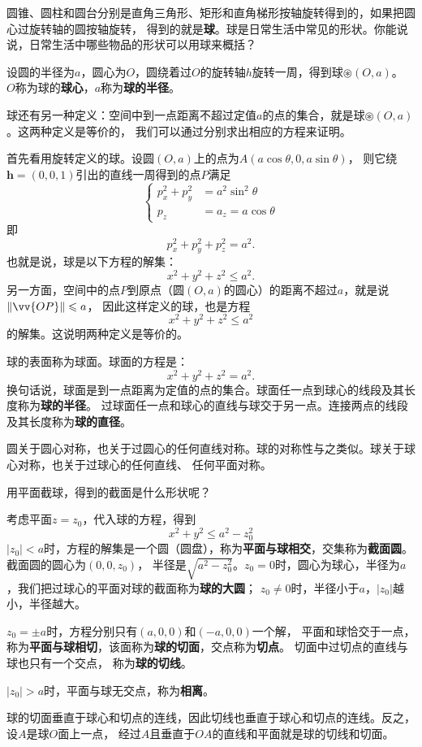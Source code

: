\documentclass[12pt,UTF8]{ctexbook}
\begin{document}
圆锥、圆柱和圆台分别是直角三角形、矩形和直角梯形按轴旋转得到的，如果把圆心过旋转轴的圆按轴旋转，
得到的就是\textbf{球}。球是日常生活中常见的形状。你能说说，日常生活中哪些物品的形状可以用球来概括？

设圆的半径为$a$，圆心为$O$，圆绕着过$O$的旋转轴$h$旋转一周，得到球$\circledast(O,a)$。
$O$称为球的\textbf{球心}，$a$称为\textbf{球的半径}。

球还有另一种定义：空间中到一点距离不超过定值$a$的点的集合，就是球$\circledast(O,a)$。这两种定义是等价的，
我们可以通过分别求出相应的方程来证明。

首先看用旋转定义的球。设圆$(O,a)$上的点为$A(a\cos{\theta}, 0, a\sin{\theta})$，
则它绕$\mathbf{h} = (0,0,1)$引出的直线一周得到的点$P$满足
$$
\left\{
\begin{array}{rl}
p_x^2+p_y^2 &= a^2\sin^2{\theta} \\
p_z &= a_z = a\cos{\theta}
\end{array}
\right.
$$
即
$$ p_x^2 + p_y^2 + p_z^2 = a^2.$$
也就是说，球是以下方程的解集：
$$ x^2 + y^2 + z^2 \leqslant a^2.$$
另一方面，空间中的点$P$到原点（圆$(O,a)$的圆心）的距离不超过$a$，就是说$\|\vv{OP}\| \leqslant a$​，
因此这样定义的球，也是方程
$$ x^2 + y^2 + z^2 \leqslant a^2$$
的解集。这说明两种定义是等价的。

球的表面称为球面。球面的方程是：
$$ x^2 + y^2 + z^2 = a^2.$$
换句话说，球面是到一点距离为定值的点的集合。球面任一点到球心的线段及其长度称为\textbf{球的半径}。
过球面任一点和球心的直线与球交于另一点。连接两点的线段及其长度称为\textbf{球的直径}。

圆关于圆心对称，也关于过圆心的任何直线对称。球的对称性与之类似。球关于球心对称，也关于过球心的任何直线、
任何平面对称。

用平面截球，得到的截面是什么形状呢？

考虑平面$z=z_0$，代入球的方程，得到
$$ x^2 + y^2 \leqslant a^2-z_0^2 $$
$|z_0|<a$时，方程的解集是一个圆（圆盘），称为\textbf{平面与球相交}，交集称为\textbf{截面圆}。截面圆的圆心为$(0,0,z_0)$，
半径是$\sqrt{a^2-z_0^2}$。$z_0=0$时，圆心为球心，半径为$a$，我们把过球心的平面对球的截面称为\textbf{球的大圆}；
$z_0\neq 0$时，半径小于$a$，$|z_0|$越小，半径越大。

$z_0=\pm a$时，方程分别只有$(a,0,0)$和$(-a,0,0)$一个解，
平面和球恰交于一点，称为\textbf{平面与球相切}，该面称为\textbf{球的切面}，交点称为\textbf{切点}。
切面中过切点的直线与球也只有一个交点，
称为\textbf{球的切线}。

$|z_0|>a$时，平面与球无交点，称为\textbf{相离}。

球的切面垂直于球心和切点的连线，因此切线也垂直于球心和切点的连线。反之，设$A$是球$O$面上一点，
经过$A$且垂直于$OA$的直线和平面就是球的切线和切面。
\end{document}
